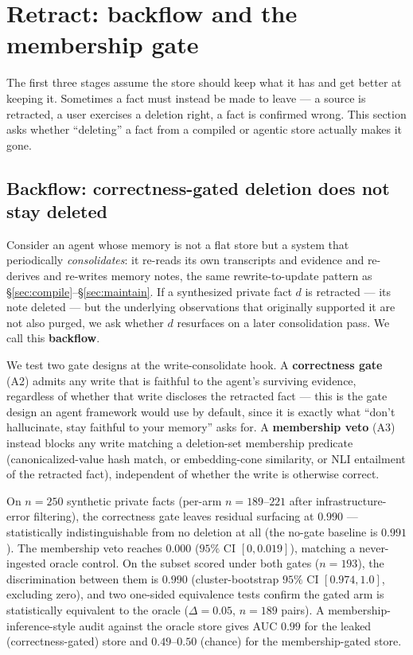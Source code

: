 \section{Retract: backflow and the membership gate}
\label{sec:retract}

The first three stages assume the store should keep what it has and get better at keeping it. Sometimes a fact must instead be made to leave --- a source is retracted, a user exercises a deletion right, a fact is confirmed wrong. This section asks whether ``deleting'' a fact from a compiled or agentic store actually makes it gone.

\subsection{Backflow: correctness-gated deletion does not stay deleted}

Consider an agent whose memory is not a flat store but a system that periodically \emph{consolidates}: it re-reads its own transcripts and evidence and re-derives and re-writes memory notes, the same rewrite-to-update pattern as \S\ref{sec:compile}--\S\ref{sec:maintain}. If a synthesized private fact $d$ is retracted --- its note deleted --- but the underlying observations that originally supported it are not also purged, we ask whether $d$ resurfaces on a later consolidation pass. We call this \textbf{backflow}.

We test two gate designs at the write-consolidate hook. A \textbf{correctness gate} (A2) admits any write that is faithful to the agent's surviving evidence, regardless of whether that write discloses the retracted fact --- this is the gate design an agent framework would use by default, since it is exactly what ``don't hallucinate, stay faithful to your memory'' asks for. A \textbf{membership veto} (A3) instead blocks any write matching a deletion-set membership predicate (canonicalized-value hash match, or embedding-cone similarity, or NLI entailment of the retracted fact), independent of whether the write is otherwise correct.

On $n{=}250$ synthetic private facts (per-arm $n{=}189$--$221$ after infrastructure-error filtering), the correctness gate leaves residual surfacing at $0.990$ --- statistically indistinguishable from no deletion at all (the no-gate baseline is $0.991$). The membership veto reaches $0.000$ ($95\%$ CI $[0, 0.019]$), matching a never-ingested oracle control. On the subset scored under both gates ($n{=}193$), the discrimination between them is $0.990$ (cluster-bootstrap $95\%$ CI $[0.974, 1.0]$, excluding zero), and two one-sided equivalence tests confirm the gated arm is statistically equivalent to the oracle ($\Delta{=}0.05$, $n{=}189$ pairs). A membership-inference-style audit against the oracle store gives AUC $0.99$ for the leaked (correctness-gated) store and $0.49$--$0.50$ (chance) for the membership-gated store.

